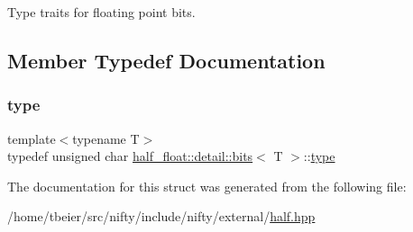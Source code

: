 Type traits for floating point bits. 

\subsection{Member Typedef Documentation}
\mbox{\label{structhalf__float_1_1detail_1_1bits_a6087f39bed27f25b3be91078a4a6dbdc}} 
\subsubsection{\texorpdfstring{type}{type}}
{\footnotesize\ttfamily template$<$typename T$>$ \\
typedef unsigned char \hyperlink{structhalf__float_1_1detail_1_1bits}{half\+\_\+float\+::detail\+::bits}$<$ T $>$\+::\hyperlink{structhalf__float_1_1detail_1_1bits_a6087f39bed27f25b3be91078a4a6dbdc}{type}}



The documentation for this struct was generated from the following file\+:\begin{DoxyCompactItemize}
\item 
/home/tbeier/src/nifty/include/nifty/external/\hyperlink{half_8hpp}{half.\+hpp}\end{DoxyCompactItemize}
